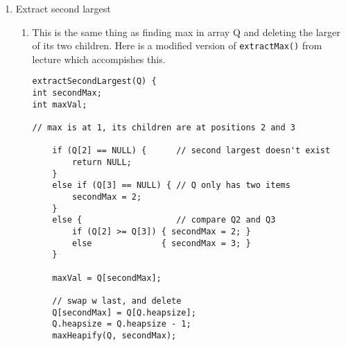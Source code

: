 \documentclass{article}
\begin{document}
\begin{enumerate}
\begin{enumerate}
        Derived from pseudo-code in Lecture 1 slides:
        \begin{lstlisting}[
        linebackgroundcolor={%
        \ifnum\value{lstnumber}=3
                \color{green!35}
        \fi
        \ifnum\value{lstnumber}=9
                \color{green!35}
        \fi
        \ifnum\value{lstnumber}=32
                \color{green!35}
        \fi
                },
]

mergeSortInversions(A,p,r) {
    inv = 0; // variable to track inversions, 
    		// gets passed to merge()
    if (p < r) {
        q = floor((p+r)/2)
        mergeSortInversions(A,p,q)
        mergeSortInversions(A, q+1, r)
        merge(A,p,q,r,inv)
    }
    return inv;
}
            
merge(A, p, q, r, inv) {
    n1 = q - p + 1
    n2 = r - q
    copy A[p,q] to L[1...n1]
    copy A[q+1,r] to R[1...n2]
    L[n1+1] = R[n1+1] = +Inf
    i = j = 1
    for (k=p to r) {
        if (L[i] < R[j]) {
            A[k] = L[i]
            i++
        }
        else {
            // a value R[j] was taken from the right 
            // side in the process of merging;
            // R[j] must be an inversion relative to 
            // everything remaining on the left side
            A[k] = R[j]
            inv += L.length - i
            j++
        }
    }
}
        \end{lstlisting}
    \end{enumerate}
    
    \item Extract second largest
    
    \begin{enumerate}
    	\item This is the same thing as finding max in array Q and deleting the larger of its two children. Here is a modified version of \texttt{extractMax()} from lecture which accompishes this.
    	\begin{lstlisting}
extractSecondLargest(Q) {
int secondMax;
int maxVal;

// max is at 1, its children are at positions 2 and 3
	
	if (Q[2] == NULL) {      // second largest doesn't exist
		return NULL;
	} 
	else if (Q[3] == NULL) { // Q only has two items
		secondMax = 2;
	} 
	else {                   // compare Q2 and Q3
		if (Q[2] >= Q[3]) { secondMax = 2; } 
		else              { secondMax = 3; }
	}
	
	maxVal = Q[secondMax];	
	
	// swap w last, and delete	
	Q[secondMax] = Q[Q.heapsize];
	Q.heapsize = Q.heapsize - 1;
	maxHeapify(Q, secondMax);
	

\end{lstlisting}
\end{enumerate}
\end{enumerate}
\end{document}
